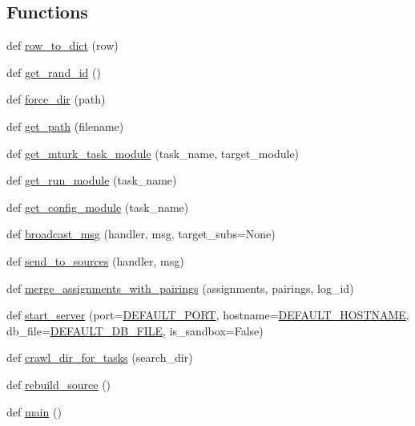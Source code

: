 \subsection*{Functions}
\begin{DoxyCompactItemize}
\item 
def \hyperlink{namespaceserver_a417f4d334a42b589c973649990ea52a8}{row\+\_\+to\+\_\+dict} (row)
\item 
def \hyperlink{namespaceserver_a2cde4e039120e25dbaa04e72af4683a3}{get\+\_\+rand\+\_\+id} ()
\item 
def \hyperlink{namespaceserver_a9ddf2e515b916af96b6e9e79894482ed}{force\+\_\+dir} (path)
\item 
def \hyperlink{namespaceserver_aa8c035a44061d07462939492cd21b0b8}{get\+\_\+path} (filename)
\item 
def \hyperlink{namespaceserver_a20f5670b2d0cc9c06be867b56798550d}{get\+\_\+mturk\+\_\+task\+\_\+module} (task\+\_\+name, target\+\_\+module)
\item 
def \hyperlink{namespaceserver_a19d9a32c8654358136f27ac2f710208d}{get\+\_\+run\+\_\+module} (task\+\_\+name)
\item 
def \hyperlink{namespaceserver_a2467b58afe94f16856770faf20184b7b}{get\+\_\+config\+\_\+module} (task\+\_\+name)
\item 
def \hyperlink{namespaceserver_adf70e1f9b13f82a360769a9ce6e3333c}{broadcast\+\_\+msg} (handler, msg, target\+\_\+subs=None)
\item 
def \hyperlink{namespaceserver_a66add92486d2392c31b001d57d1e6b3e}{send\+\_\+to\+\_\+sources} (handler, msg)
\item 
def \hyperlink{namespaceserver_a30d7f5eb7c84bbe9bc4c3100bd3be229}{merge\+\_\+assignments\+\_\+with\+\_\+pairings} (assignments, pairings, log\+\_\+id)
\item 
def \hyperlink{namespaceserver_a16739378649273e6ea462b460262a854}{start\+\_\+server} (port=\hyperlink{namespaceserver_a799b32fdd2321df0f6d93809c1aca14a}{D\+E\+F\+A\+U\+L\+T\+\_\+\+P\+O\+RT}, hostname=\hyperlink{namespaceserver_a0ea5dfe17186557ed34035da16619aa6}{D\+E\+F\+A\+U\+L\+T\+\_\+\+H\+O\+S\+T\+N\+A\+ME}, db\+\_\+file=\hyperlink{namespaceserver_a4d969e2880bb5b39591808aa7992ba7f}{D\+E\+F\+A\+U\+L\+T\+\_\+\+D\+B\+\_\+\+F\+I\+LE}, is\+\_\+sandbox=False)
\item 
def \hyperlink{namespaceserver_ac31b8422e56c4f0bf9a35c5cc2234a42}{crawl\+\_\+dir\+\_\+for\+\_\+tasks} (search\+\_\+dir)
\item 
def \hyperlink{namespaceserver_a802e832a8f540e02174b559972488adb}{rebuild\+\_\+source} ()
\item 
def \hyperlink{namespaceserver_a6d1c10ed8aa5d27e61ed9db6b4274261}{main} ()
\end{DoxyCompactItemize}
